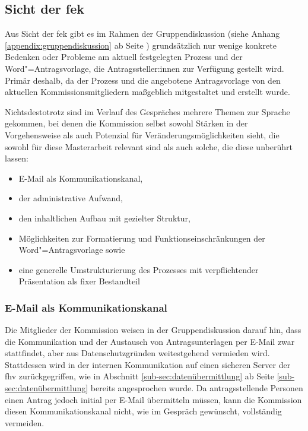 \documentclass[a4paper,12pt,twoside]{scrreprt}
\begin{document}
\subsection{Sicht der \acl{fek}}
\label{sub-sec:probleme-sicht-fek}

Aus Sicht der \acl{fek} gibt es im Rahmen der Gruppendiskussion (siehe Anhang \ref{appendix:gruppendiskussion} ab Seite \pageref{appendix:gruppendiskussion}) grundsätzlich nur wenige konkrete Bedenken oder Probleme am aktuell festgelegten Prozess und der Word"=Antragsvorlage, die Antragssteller:innen zur Verfügung gestellt wird. Primär deshalb, da der Prozess und die angebotene Antragsvorlage von den aktuellen Kommissionsmitgliedern maßgeblich mitgestaltet und erstellt wurde.

Nichtsdestotrotz sind im Verlauf des Gespräches mehrere Themen zur Sprache gekommen, bei denen die Kommission selbst sowohl Stärken in der Vorgehensweise als auch Potenzial für Veränderungsmöglichkeiten sieht, die sowohl für diese Masterarbeit relevant sind als auch solche, die diese unberührt lassen:
\begin{itemize}
    \item E-Mail als Kommunikationskanal,
    \item der administrative Aufwand,
    \item den inhaltlichen Aufbau mit gezielter Struktur,
    \item Möglichkeiten zur Formatierung und Funktionseinschränkungen der Word"=Antragsvorlage sowie
    \item eine generelle Umstrukturierung des Prozesses mit verpflichtender Präsentation als fixer Bestandteil
\end{itemize}

\subsubsection*{E-Mail als Kommunikationskanal}
\label{sub-sub-sec:email-kommunikationskanal}

Die Mitglieder der Kommission weisen in der Gruppendiskussion darauf hin, dass die Kommunikation und der Austausch von Antragsunterlagen per E-Mail zwar stattfindet, aber aus Datenschutzgründen weitestgehend vermieden wird. Stattdessen wird in der internen Kommunikation auf einen sicheren Server der \acl{fhv} zurückgegriffen, wie in Abschnitt \ref{sub-sec:datenübermittlung} ab Seite \ref{sub-sec:datenübermittlung} bereits angesprochen wurde. Da antragsstellende Personen einen Antrag jedoch initial per E-Mail übermitteln müssen, kann die Kommission diesen Kommunikationskanal nicht, wie im Gespräch gewünscht, vollständig vermeiden.
\end{document}
